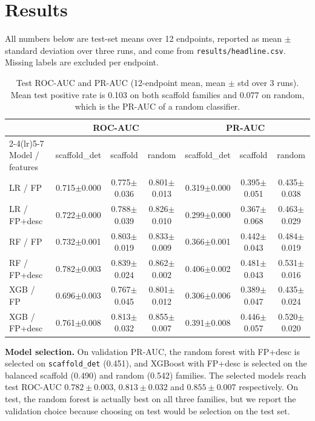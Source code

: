 \documentclass[conference]{IEEEtran}
\begin{document}
\section{Results}
All numbers below are test-set means over 12 endpoints, reported as mean $\pm$ standard deviation over three runs, and come from \texttt{results/headline.csv}. Missing labels are excluded per endpoint.

\begin{table}[t]
\centering
\caption{Test ROC-AUC and PR-AUC (12-endpoint mean, mean $\pm$ std over 3 runs). Mean test positive rate is 0.103 on both scaffold families and 0.077 on random, which is the PR-AUC of a random classifier.}
\label{tab:main}
\begin{tabular}{lcccccc}
\toprule
 & \multicolumn{3}{c}{ROC-AUC} & \multicolumn{3}{c}{PR-AUC} \\
\cmidrule(lr){2-4}\cmidrule(lr){5-7}
Model / features & scaffold\_det & scaffold & random & scaffold\_det & scaffold & random \\
\midrule
LR / FP & 0.715$\pm$0.000 & 0.775$\pm$0.036 & 0.801$\pm$0.013 & 0.319$\pm$0.000 & 0.395$\pm$0.051 & 0.435$\pm$0.038 \\
LR / FP+desc & 0.722$\pm$0.000 & 0.788$\pm$0.039 & 0.826$\pm$0.010 & 0.299$\pm$0.000 & 0.367$\pm$0.068 & 0.463$\pm$0.029 \\
RF / FP & 0.732$\pm$0.001 & 0.803$\pm$0.019 & 0.833$\pm$0.009 & 0.366$\pm$0.001 & 0.442$\pm$0.043 & 0.484$\pm$0.019 \\
RF / FP+desc & 0.782$\pm$0.003 & 0.839$\pm$0.024 & 0.862$\pm$0.002 & 0.406$\pm$0.002 & 0.481$\pm$0.043 & 0.531$\pm$0.016 \\
XGB / FP & 0.696$\pm$0.003 & 0.767$\pm$0.045 & 0.801$\pm$0.012 & 0.306$\pm$0.006 & 0.389$\pm$0.047 & 0.435$\pm$0.024 \\
XGB / FP+desc & 0.761$\pm$0.008 & 0.813$\pm$0.032 & 0.855$\pm$0.007 & 0.391$\pm$0.008 & 0.446$\pm$0.057 & 0.520$\pm$0.020 \\
\bottomrule
\end{tabular}
\end{table}

\textbf{Model selection.} On validation PR-AUC, the random forest with FP+desc is selected on \texttt{scaffold\_det} (0.451), and XGBoost with FP+desc is selected on the balanced scaffold (0.490) and random (0.542) families. The selected models reach test ROC-AUC $0.782\pm0.003$, $0.813\pm0.032$ and $0.855\pm0.007$ respectively. On test, the random forest is actually best on all three families, but we report the validation choice because choosing on test would be selection on the test set.
\end{document}
